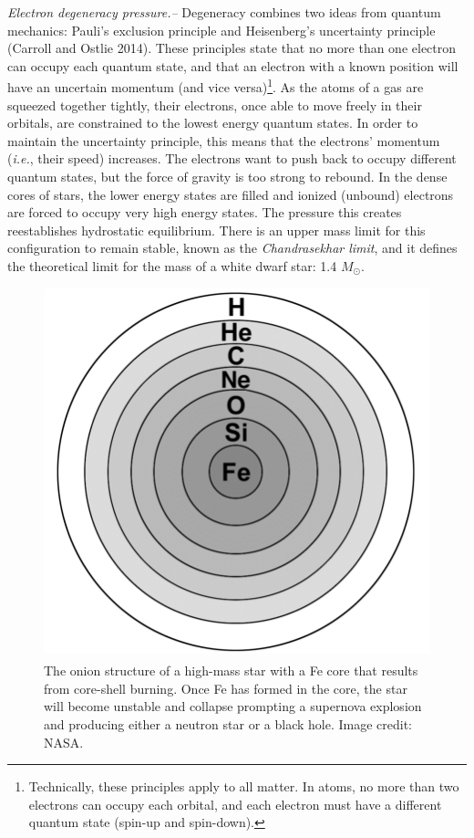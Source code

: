 \documentclass[1.5,11pt]{beavtex}
\begin{document}
\textit{Electron degeneracy pressure.–} Degeneracy combines two ideas from quantum mechanics: Pauli's exclusion principle and Heisenberg's uncertainty principle (Carroll and Ostlie 2014). These principles state that no more than one electron can occupy each quantum state, and that an electron with a known position will have an uncertain momentum (and vice versa)\footnote{\selectfont Technically, these principles apply to all matter. In atoms, no more than two electrons can occupy each orbital, and each electron must have a different quantum state (spin-up and spin-down).}. As the atoms of a gas are squeezed together tightly, their electrons, once able to move freely in their orbitals, are constrained to the lowest energy quantum states. In order to maintain the uncertainty principle, this means that the electrons' momentum (\textit{i.e.}, their speed) increases. The electrons want to push back to occupy different quantum states, but the force of gravity is too strong to rebound. In the dense cores of stars, the lower energy states are filled and ionized (unbound) electrons are forced to occupy very high energy states. The pressure this creates reestablishes hydrostatic equilibrium. There is an upper mass limit for this configuration to remain stable, known as the \textit{Chandrasekhar limit}, and it defines the theoretical limit for the mass of a white dwarf star: 1.4 \(M_\odot\).  

\begin{figure}[h!]
  \centering
  \includegraphics[scale=0.20]{images/ch2/onion-structure.png}
  \caption{\selectfont The onion structure of a high-mass star with a Fe core that results from core-shell burning. Once Fe has formed in the core, the star will become unstable and collapse prompting a supernova explosion and producing either a neutron star or a black hole. Image credit: NASA.}
  \label{fig:onion-structure}
\end{figure}
\end{document}
